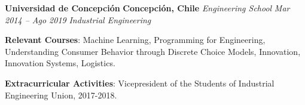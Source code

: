 \item
\headerrow
{\textbf{Universidad de Concepción}}
{\textbf{Concepción, Chile}}
\headerrow
{\emph{Engineering School}}
{\emph{Mar 2014 -- Ago 2019}}
{\emph{Industrial Engineering}}
\begin{itemize*}
    \item \textbf{Relevant Courses}: Machine Learning, Programming for Engineering, 
    Understanding Consumer Behavior through Discrete Choice Models, Innovation, 
    Innovation Systems, Logistics.
    \item \textbf{Extracurricular Activities}: Vicepresident of the Students of Industrial
    Engineering Union, 2017-2018.
\end{itemize*}